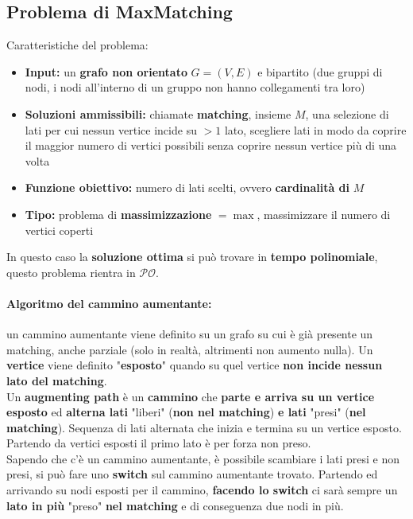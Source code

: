 \documentclass[11pt]{article}
\begin{document}
	\newpage
	

	\subsection{Problema di MaxMatching} 
	Caratteristiche del problema: 
	\begin{itemize}
		\item \textbf{Input:} un \textbf{grafo non orientato} $G = (V, E)$ e bipartito (due gruppi di nodi, i nodi all'interno di un gruppo non hanno collegamenti tra loro)
		\item \textbf{Soluzioni ammissibili:} chiamate \textbf{matching}, insieme $M$, una selezione di lati per cui nessun vertice incide su $>1$ lato, scegliere lati in modo da coprire il maggior numero di vertici possibili senza coprire nessun vertice più di una volta
		
		\item \textbf{Funzione obiettivo:} numero di lati scelti, ovvero \textbf{cardinalità di} $M$
		
		\item \textbf{Tipo:} problema di \textbf{massimizzazione} $= \max$, massimizzare il numero di vertici coperti
	\end{itemize}
	
	In questo caso la \textbf{soluzione ottima} si può trovare in \textbf{tempo polinomiale}, questo problema rientra in $\mathcal{PO}$. \\
	
	\paragraph{Algoritmo del cammino aumentante:} un cammino aumentante viene definito su un grafo su cui è già presente un matching, anche parziale (solo in realtà, altrimenti non aumento nulla). Un \textbf{vertice} viene definito "\textbf{esposto}" quando su quel vertice \textbf{non incide nessun lato del matching}. \\
	
	Un \textbf{augmenting path} è un \textbf{cammino} che \textbf{parte e arriva su un vertice esposto} ed \textbf{alterna lati} "liberi" (\textbf{non nel matching}) \textbf{e lati} "presi" (\textbf{nel matching}). Sequenza di lati alternata che inizia e termina su un vertice esposto. Partendo da vertici esposti il primo lato è per forza non preso.\\
	
	Sapendo che c'è un cammino aumentante, è possibile scambiare i lati presi e non presi, si può fare uno \textbf{switch} sul cammino aumentante trovato. Partendo ed arrivando su nodi esposti per il cammino, \textbf{facendo lo switch} ci sarà sempre un \textbf{lato in più} "preso" \textbf{nel matching} e di conseguenza due nodi in più.\\
	
\end{document}
